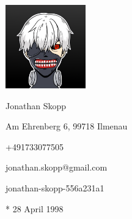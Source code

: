 \documentclass[a4paper,10pt]{article}
\newlength{\cvcolumngapwidth}
\newlength{\cvleftcolumnwidth}
\newlength{\cvrightcolumnwidth}
\newcommand{\cvnamestyle}[1]{{\Large\cvnamefont\textcolor{cvnamecolor}{#1}}}
\newcommand{\cvsectionstyle}[1]{{\normalsize\cvsectionfont\textcolor{cvsectioncolor}{#1}}}
\newcommand{\cvtitlestyle}[1]{{\large\cvtitlefont\textcolor{cvtitlecolor}{#1}}}
\newcommand{\cvdurationstyle}[1]{{\small\cvdurationfont\textcolor{cvdurationcolor}{#1}}}
\newlength{\cvafteritemskipamount}
\newlength{\cvaftersectionskipamount}
\newlength{\cvafternameskipamount}
\newlength{\cvafterpersonalinfolineskipamount}
\newlength{\cvaftertitleskipamount}
\newlength{\cvparskip}
\newcommand{\cvpersonalinfo}[2]{
    \begin{minipage}[t]{\cvleftcolumnwidth}
        \vspace{0mm} %
        \raggedleft #1
    \end{minipage}%
    \hspace{\cvcolumngapwidth}%
    \begin{minipage}[t]{\cvrightcolumnwidth}
        \vspace{0mm} %
        #2
    \end{minipage}

    \vspace{\cvafteritemskipamount}
}
\newcommand{\cvname}[1]{
    \cvnamestyle{#1}

    \vspace{\cvafternameskipamount}
}
\newcommand{\cvpersonalinfolinewithicon}[3]{
    \raisebox{.5\fontcharht\font`E-.5\height}{\texttt{[image: \#2]}}
    #3

    \vspace{\cvafterpersonalinfolineskipamount}
}
\newcommand{\cvsection}[1]{
    \begin{minipage}[t]{\cvleftcolumnwidth}
        \raggedleft\cvsectionstyle{#1}
    \end{minipage}%
    \hspace{\cvcolumngapwidth}%
    \begin{minipage}[t]{\cvrightcolumnwidth}
        \textcolor{cvrulecolor}{\rule{\cvrightcolumnwidth}{0.3mm}}
    \end{minipage}

    \vspace{\cvaftersectionskipamount}
}
\newcommand{\cvitem}[2]{
    \begin{minipage}[t]{\cvleftcolumnwidth}
        \raggedleft #1
    \end{minipage}%
    \hspace{\cvcolumngapwidth}%
    \begin{minipage}[t]{\cvrightcolumnwidth}
        \setlength{\parskip}{\cvparskip} #2
    \end{minipage}

    \vspace{\cvafteritemskipamount}
}
\newcommand{\cvtitle}[1]{
    \cvtitlestyle{#1}

    \vspace{\cvaftertitleskipamount}
    \vspace{-\cvparskip}
}
\begin{document}

\cvpersonalinfo{
    \includegraphics[height=36mm]{Ken_Alex.png}
}{
    \cvname{Jonathan Skopp}

    \cvpersonalinfolinewithicon{height=4mm}{072-location.pdf}{
        Am Ehrenberg 6, 99718 Ilmenau
    }

    \cvpersonalinfolinewithicon{height=4mm}{067-phone.pdf}{
        +491733077505
    }

    \cvpersonalinfolinewithicon{height=4mm}{070-envelop.pdf}{
        jonathan.skopp@gmail.com    
    }

    \cvpersonalinfolinewithicon{height=4mm}{458-linkedin.pdf}{
        jonathan-skopp-556a231a1
    }

    * 28 April 1998
}




%
%

%
%
\end{document}
